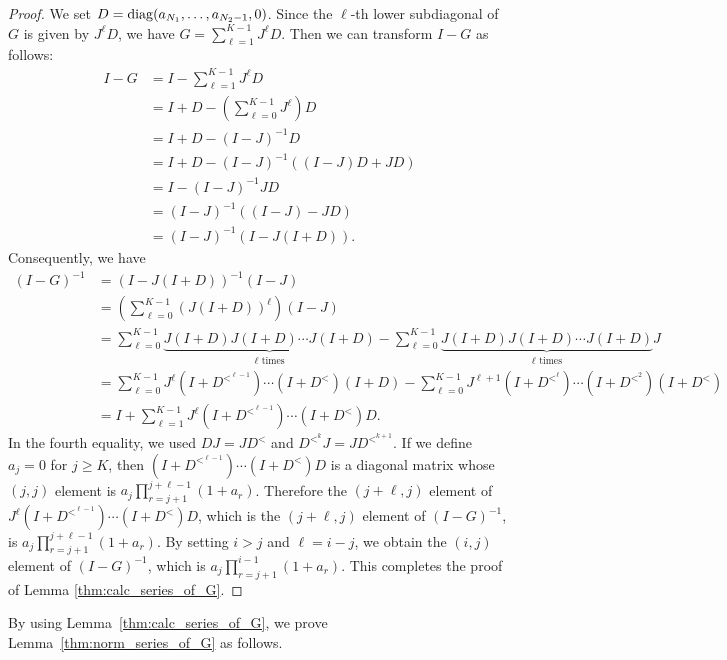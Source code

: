 \documentclass[pdflatex,sn-mathphys-num]{sn-jnl}%
\theoremstyle{thmstyleone}%
\theoremstyle{thmstyletwo}%
\theoremstyle{thmstylethree}%
\begin{document}
\begin{proof}
We set $D={\rm diag}(a_{N_{1}},\ldots,a_{N_{2}-1},0)$. 
Since the $\ell$-th lower subdiagonal of $G$ is given by $J^{\ell}D$, 
we have $G=\sum_{\ell=1}^{K-1} J^{\ell}D$. 
Then we can transform $I-G$ as follows:
\begin{align}
I-G &= I-\sum_{\ell=1}^{K-1} J^{\ell}D \nonumber \\
&= I+D - \left(\sum_{\ell=0}^{K-1} J^{\ell}\right)D \nonumber \\
&= I+D-(I-J)^{-1}D \nonumber \\
&= I+D-(I-J)^{-1}( (I-J)D + JD ) \nonumber \\
&= I-(I-J)^{-1}JD \nonumber \\
&= (I-J)^{-1} ((I-J) - JD) \nonumber \\
&= (I-J)^{-1}(I-J(I+D)).
\end{align}
Consequently, we have
\begin{align}
(I-G)^{-1}&=(I-J(I+D))^{-1}(I-J) \nonumber \\
&= \left(\sum_{\ell=0}^{K-1}(J(I+D))^{\ell}\right)(I-J) \nonumber \\
&= \sum_{\ell=0}^{K-1}\underbrace{J(I+D)J(I+D)\cdots J(I+D)}_{\text{$\ell$ times}}-\sum_{\ell=0}^{K-1}\underbrace{J(I+D)J(I+D)\cdots J(I+D)}_{\text{$\ell$ times}}J \nonumber \\
&= \sum_{\ell=0}^{K-1}J^{\ell}(I+D^{<^{\ell-1}})\cdots(I+D^<)(I+D)-\sum_{\ell=0}^{K-1}J^{\ell+1}(I+D^{<^{\ell}})\cdots(I+D^{<^2})(I+D^<) \nonumber \\
&= I+\sum_{\ell=1}^{K-1}J^{\ell}(I+D^{<^{\ell-1}})\cdots(I+D^<)D.
\end{align}
In the fourth equality, we used $DJ=JD^<$ and $D^{<^{k}} J = J D^{<^{k+1}}$. 
If we define $a_j=0$ for $j\ge K$, then $(I+D^{<^{\ell-1}})\cdots(I+D^<)D$ is a diagonal matrix whose $(j,j)$ element is $a_j\prod_{r=j+1}^{j+\ell-1}(1+a_r)$. Therefore the $(j+\ell,j)$ element of $J^{\ell}(I+D^{<^{\ell-1}})\cdots(I+D^<)D$, which is the $(j+\ell,j)$ element of $(I-G)^{-1}$, is $a_j\prod_{r=j+1}^{j+\ell-1}(1+a_r)$. By setting $i>j$ and $\ell=i-j$, we obtain the $(i,j)$ element of $(I-G)^{-1}$, which is $a_j\prod_{r=j+1}^{i-1}(1+a_r)$. This completes the proof of Lemma \ref{thm:calc_series_of_G}.
\end{proof}

By using Lemma~\ref{thm:calc_series_of_G}, 
we prove Lemma~\ref{thm:norm_series_of_G} as follows.
\end{document}
